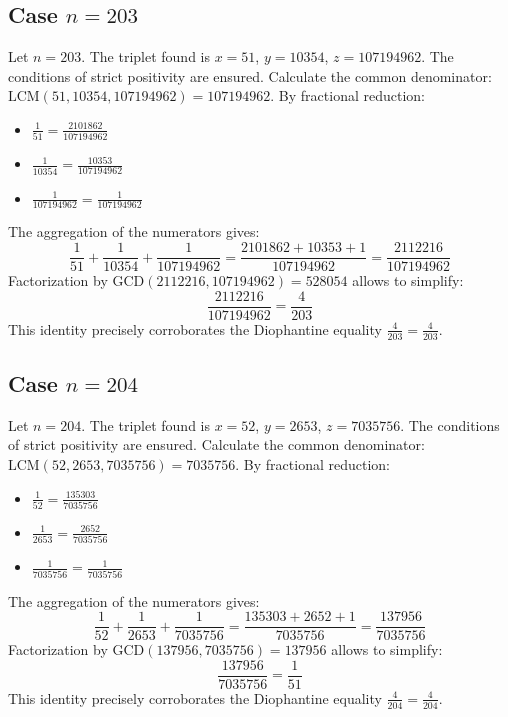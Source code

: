 \documentclass[11pt,a4paper]{article}
\begin{document}
\subsection{Case $n = 203$}
Let $n = 203$. The triplet found is $x = 51$, $y = 10354$, $z = 107194962$.
The conditions of strict positivity are ensured.
Calculate the common denominator: $\text{LCM}(51, 10354, 107194962) = 107194962$.
By fractional reduction:
\begin{itemize}
    \item $\frac{1}{51} = \frac{2101862}{107194962}$
    \item $\frac{1}{10354} = \frac{10353}{107194962}$
    \item $\frac{1}{107194962} = \frac{1}{107194962}$
\end{itemize}
The aggregation of the numerators gives:
$$ \frac{1}{51} + \frac{1}{10354} + \frac{1}{107194962} = \frac{2101862 + 10353 + 1}{107194962} = \frac{2112216}{107194962} $$
Factorization by $\text{GCD}(2112216, 107194962) = 528054$ allows to simplify:
$$ \frac{2112216}{107194962} = \frac{4}{203} $$
This identity precisely corroborates the Diophantine equality $\frac{4}{203} = \frac{4}{203}$.

\subsection{Case $n = 204$}
Let $n = 204$. The triplet found is $x = 52$, $y = 2653$, $z = 7035756$.
The conditions of strict positivity are ensured.
Calculate the common denominator: $\text{LCM}(52, 2653, 7035756) = 7035756$.
By fractional reduction:
\begin{itemize}
    \item $\frac{1}{52} = \frac{135303}{7035756}$
    \item $\frac{1}{2653} = \frac{2652}{7035756}$
    \item $\frac{1}{7035756} = \frac{1}{7035756}$
\end{itemize}
The aggregation of the numerators gives:
$$ \frac{1}{52} + \frac{1}{2653} + \frac{1}{7035756} = \frac{135303 + 2652 + 1}{7035756} = \frac{137956}{7035756} $$
Factorization by $\text{GCD}(137956, 7035756) = 137956$ allows to simplify:
$$ \frac{137956}{7035756} = \frac{1}{51} $$
This identity precisely corroborates the Diophantine equality $\frac{4}{204} = \frac{4}{204}$.
\end{document}
